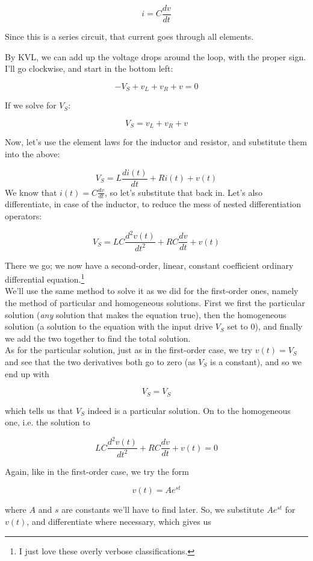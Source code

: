 \documentclass[12pt,a4paper]{report}
\begin{document}
\[ i = C \frac{dv}{dt} \]

Since this is a series circuit, that current goes through all elements.

By KVL, we can add up the voltage drops around the loop, with the proper sign. I'll go clockwise, and start in the bottom left:

\[ -V_S + v_L + v_R + v = 0 \]

If we solve for $V_S$:

\[ V_S = v_L + v_R + v \]

Now, let's use the element laws for the inductor and resistor, and substitute them into the above:

\[ V_S = L \frac{di(t)}{dt} + R i(t) + v(t) \]
\newpage
We know that $i(t) = C \frac{dv}{dt}$, so let's substitute that back in. Let's also differentiate, in case of the inductor, to reduce the mess of nested differentiation operators:

\[ V_S = LC \frac{d^2v(t)}{dt^2} + RC \frac{dv}{dt} + v(t) \]

There we go; we now have a second-order, linear, constant coefficient ordinary differential equation.\footnote{I just love these overly verbose classifications.}\\

We'll use the same method to solve it as we did for the first-order ones, namely the method of particular and homogeneous solutions. First we first the particular solution (\emph{any} solution that makes the equation true), then the homogeneous solution (a solution to the equation with the input drive $V_S$ set to 0), and finally we add the two together to find the total solution.\\

As for the particular solution, just as in the first-order case, we try $v(t) = V_S$ and see that the two derivatives both go to zero (as $V_S$ is a constant), and so we end up with

\[ V_S = V_S \]

which tells us that $V_S$ indeed is a particular solution. On to the homogeneous one, i.e. the solution to 

\[ LC \frac{d^2v(t)}{dt^2} + RC \frac{dv}{dt} + v(t) = 0\]

Again, like in the first-order case, we try the form 

\[ v(t) = Ae^{st} \]

where $A$ and $s$ are constants we'll have to find later. So, we substitute $Ae^{st}$ for $v(t)$, and differentiate where necessary, which gives us
\end{document}
